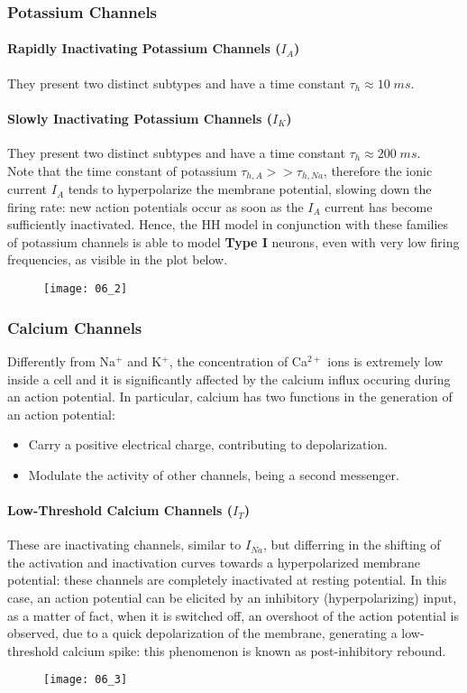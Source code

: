 \subsubsection{Potassium Channels}
\paragraph{Rapidly Inactivating Potassium Channels (\(I_{A}\))} They present two distinct
subtypes and have a time constant \(\tau_{h}\approx{10\;ms}\).
\paragraph{Slowly Inactivating Potassium Channels (\(I_{K}\))} They present two distinct
subtypes and have a time constant \(\tau_{h}\approx{200\;ms}\).\\
Note that the time constant of potassium \(\tau_{h,A}>>\tau_{h,Na}\), therefore the ionic
current \(I_{A}\) tends to hyperpolarize the membrane potential, slowing down the firing
rate: new action potentials occur as soon as the \(I_{A}\) current has become sufficiently
inactivated. Hence, the HH model in conjunction with these families of potassium channels
is able to model \textbf{Type I} neurons, even with very low firing frequencies, as
visible in the plot below.
\begin{figure}[H]
    \texttt{[image: 06\_2]}
    \centering
\end{figure}
\subsubsection{Calcium Channels}
Differently from Na\({}^{+}\) and K\({}^{+}\), the concentration of Ca\({}^{2+}\) ions
is extremely low inside a cell and it is significantly affected by the calcium influx
occuring during an action potential. In particular, calcium has two functions in the
generation of an action potential:
\begin{itemize}
    \item Carry a positive electrical charge, contributing to depolarization.
    \item Modulate the activity of other channels, being a second messenger.
\end{itemize}
\paragraph{Low-Threshold Calcium Channels (\(I_{T}\))} These are inactivating channels,
similar to \(I_{Na}\), but differring in the shifting of the activation and inactivation
curves towards a hyperpolarized membrane potential: these channels are completely
inactivated at resting potential. In this case, an action potential can be elicited
by an inhibitory (hyperpolarizing) input, as a matter of fact, when it is switched off,
an overshoot of the action potential is observed, due to a quick depolarization of the
membrane, generating a low-threshold calcium spike: this phenomenon is known as
post-inhibitory rebound.
\begin{figure}[H]
    \texttt{[image: 06\_3]}
    \centering
\end{figure}
